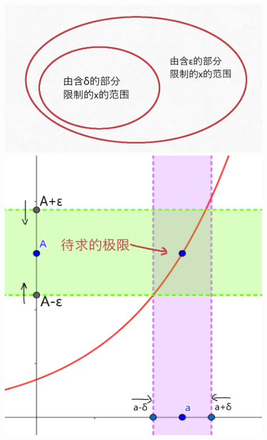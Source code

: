 \documentclass[fontset=none]{ctexart}
\begin{document}
    \begin{figure}[htbp]
        \centering
        \subfigure
        {
            \begin{minipage}[b]{.5\linewidth}
                \includegraphics[scale=0.4]{1.png}
            \end{minipage}
        }
        \subfigure
        {
             \begin{minipage}[b]{.3\linewidth}
                \includegraphics[scale=0.3]{2.png}
            \end{minipage}
        }
    \end{figure}
    
\end{document}
